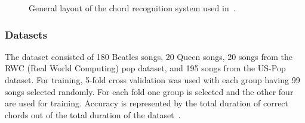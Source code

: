 \documentclass{sig-alternate}
\begin{document}




\begin{figure}
\centering
{}
\caption{General layout of the chord recognition system used in~\cite{TaeMin:2014}.}
\label{fig:fig3}
\end{figure}

\subsubsection{Datasets}

The dataset consisted of 180 Beatles songs, 20 Queen songs, 20 songs from the RWC (Real World Computing) pop dataset, and 195 songs from the US-Pop dataset. For training, 5-fold cross validation was used with each group having 99 songs selected randomly. For each fold one group is selected and the other four are used for training. Accuracy is represented by the total duration of correct chords out of the total duration of the dataset~\cite{TaeMin:2014}.



\end{document}
